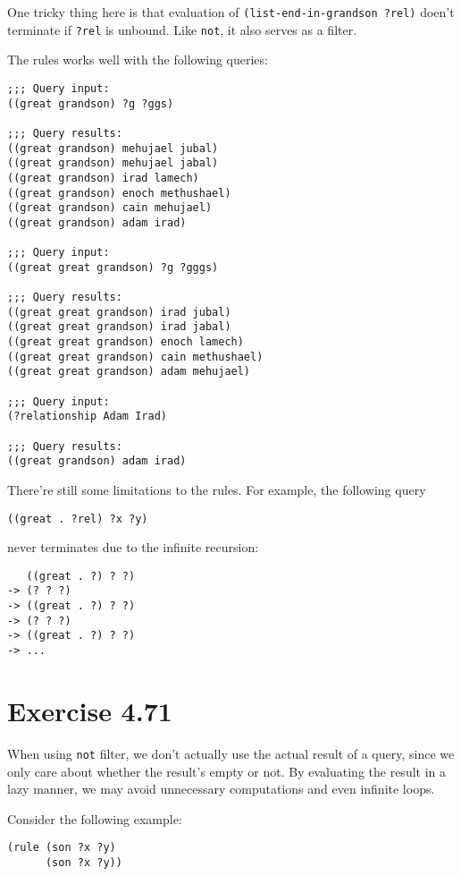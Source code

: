 \documentclass[../main.tex]{subfiles}
\begin{document}
One tricky thing here is that evaluation of \lstinline{(list-end-in-grandson ?rel)} doen't terminate if \lstinline{?rel} is unbound. Like \lstinline{not}, it also serves as a filter.

The rules works well with the following queries:

\begin{lstlisting}
;;; Query input:
((great grandson) ?g ?ggs)

;;; Query results:
((great grandson) mehujael jubal)
((great grandson) mehujael jabal)
((great grandson) irad lamech)
((great grandson) enoch methushael)
((great grandson) cain mehujael)
((great grandson) adam irad)

;;; Query input:
((great great grandson) ?g ?gggs)

;;; Query results:
((great great grandson) irad jubal)
((great great grandson) irad jabal)
((great great grandson) enoch lamech)
((great great grandson) cain methushael)
((great great grandson) adam mehujael)

;;; Query input:
(?relationship Adam Irad)

;;; Query results:
((great grandson) adam irad)
\end{lstlisting}

There're still some limitations to the rules. For example, the following query

\begin{lstlisting}
((great . ?rel) ?x ?y)
\end{lstlisting}

never terminates due to the infinite recursion:

\begin{lstlisting}
   ((great . ?) ? ?)
-> (? ? ?)
-> ((great . ?) ? ?)
-> (? ? ?)
-> ((great . ?) ? ?)
-> ...
\end{lstlisting}

\section{Exercise 4.71}

When using \lstinline{not} filter, we don't actually use the actual result of a query, since we only care about whether the result's empty or not. By evaluating the result in a lazy manner, we may avoid unnecessary computations and even infinite loops.

Consider the following example:

\begin{lstlisting}
(rule (son ?x ?y)
      (son ?x ?y))
\end{lstlisting}
\end{document}
